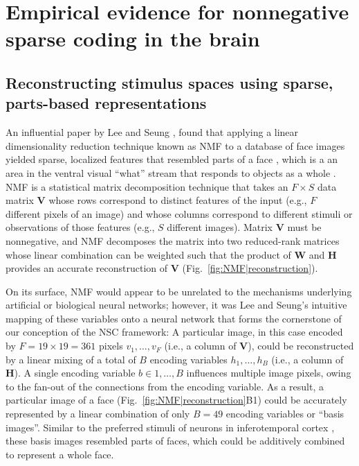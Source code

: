 \section{Empirical evidence for nonnegative sparse coding in the brain}

\subsection{Reconstructing stimulus spaces using sparse, parts-based representations}

An influential paper by Lee and Seung \citep{LeeSeung1999},
found that applying a linear dimensionality reduction technique
known as \ac{NMF} to a database of face images
yielded sparse, localized features that resembled parts of a face \citep{Wachsmuth1994},
which is a an area in the ventral visual ``what'' stream
that responds to objects as a whole
\citep{ungerleider1994and}.
\ac{NMF} is a statistical matrix decomposition technique 
that takes an $F \times S$ data matrix \textbf{V} 
whose rows correspond to distinct features of the input 
(e.g., $F$ different pixels of an image)
and whose columns correspond to different stimuli or 
observations of those features
(e.g., $S$ different images). 
Matrix \textbf{V} must be nonnegative, and \ac{NMF} decomposes the matrix into two reduced-rank matrices whose linear combination can be weighted such that the product of \textbf{W} and \textbf{H} provides an accurate reconstruction of \textbf{V} (Fig.~\ref{fig:NMF|reconstruction}).

On its surface, NMF would appear to be unrelated to the mechanisms underlying 
artificial or biological neural networks;
however, it was Lee and Seung's intuitive mapping of these variables onto
a neural network that forms the cornerstone of our conception of the NSC framework:
A particular image, in this case encoded by $F = 19 \times 19 = 361$ 
pixels $v_1, \ldots, v_F$
(i.e., a column of \textbf{V}),
could be reconstructed by a linear mixing of a total of $B$ encoding variables
$h_1, \ldots, h_B$ (i.e., a column of \textbf{H}).
A single encoding variable $b \in 1, \ldots, B$ 
influences multiple image pixels,
owing to the fan-out of the connections from the encoding variable.
As a result, a particular image of a face (Fig.~\ref{fig:NMF|reconstruction}B1)
could be accurately represented by a linear combination of 
only $B = 49$ encoding variables or ``basis images''.
Similar to the preferred stimuli of
neurons in inferotemporal cortex \citep{Wachsmuth1994},
these basis images resembled parts of faces,
which could be additively combined to represent a whole face.

